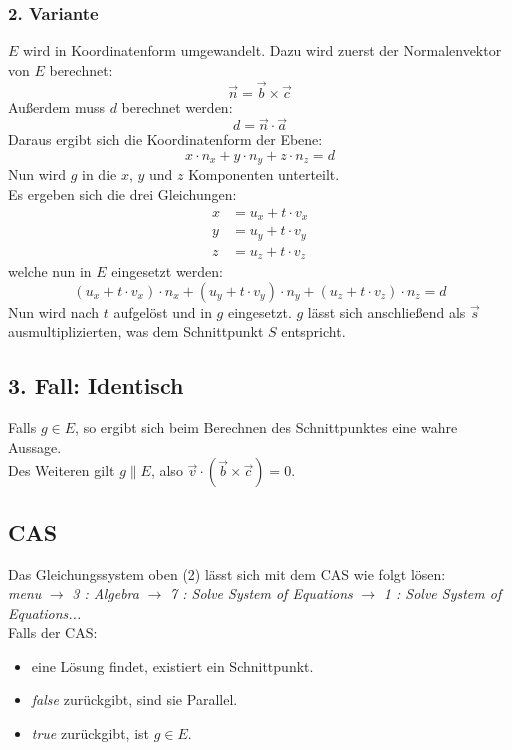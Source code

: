 \documentclass[a4paper,12pt]{article}
\begin{document}
\subsubsection*{2. Variante}
$E$ wird in Koordinatenform umgewandelt. Dazu wird zuerst der Normalenvektor von $E$ berechnet:
$$\vec{n} = \vec{b} \times \vec{c}$$
Außerdem muss $d$ berechnet werden:
$$d = \vec{n} \cdot \vec{a}$$
Daraus ergibt sich die Koordinatenform der Ebene:
$$x \cdot n_x + y \cdot n_y + z \cdot n_z = d$$
Nun wird $g$ in die $x$, $y$ und $z$ Komponenten unterteilt.\\
Es ergeben sich die drei Gleichungen:
\begin{equation}
\begin{split}
x & = u_x + t \cdot v_x\\
y & = u_y + t \cdot v_y\\
z & = u_z + t \cdot v_z
\end{split}
\end{equation}
welche nun in $E$ eingesetzt werden:
$$(u_x + t \cdot v_x) \cdot n_x + (u_y + t \cdot v_y) \cdot n_y + (u_z + t \cdot v_z) \cdot n_z = d$$
Nun wird nach $t$ aufgelöst und in $g$ eingesetzt. $g$ lässt sich anschließend als $\vec{s}$ ausmultiplizierten, was dem Schnittpunkt $S$ entspricht.
\subsection{3. Fall: Identisch}
Falls $g \in E$, so ergibt sich beim Berechnen des Schnittpunktes eine wahre Aussage.\\
Des Weiteren gilt $g \parallel E$, also $\vec{v} \cdot (\vec{b} \times \vec{c}) = 0$.
\subsection{CAS}
Das Gleichungssystem oben (2) lässt sich mit dem CAS wie folgt lösen:\\
\textit{menu} $\rightarrow$ \textit{3 : Algebra} $\rightarrow$ \textit{7 : Solve System of Equations} $\rightarrow$ \textit{1 : Solve System of Equations...}\\
Falls der CAS:
\begin{itemize}
\item eine Lösung findet, existiert ein Schnittpunkt.
\item \textit{false} zurückgibt, sind sie Parallel.
\item \textit{true} zurückgibt, ist $g \in E$.
\end{itemize}
\end{document}
